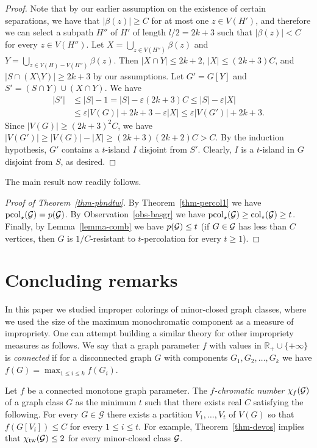 \documentclass[12pt]{article}
\newcommand{\GG}{{\cal G}}
\newcommand{\eps}{\varepsilon}
\newcommand{\mc}[1]{\mathcal{#1}}
\newcommand{\brm}[1]{\operatorname{#1}}
\newcommand{\bb}[1]{\mathbb{#1}}
\begin{document}
\begin{proof}
Note that by our earlier assumption on the existence of certain separations,  we have that $|\beta(z)| \geq C$ for at most one $z \in V(H')$, and therefore we can select
a subpath  $H''$ of $H'$  of length $l/2=2k+3$ 
such that  $|\beta(z)| < C$ for every $z \in V(H'')$. Let $X=\bigcup_{z \in V(H'')}\beta(z)$ and
$Y= \bigcup_{z \in V(H)-V(H'')}\beta(z)$. Then $|X \cap Y| \leq 2k+2$, $|X| \leq (2k+3)C$, and $|S \cap (X \setminus Y)| \geq 2k+3$ by our assumptions.
Let $G'=G[Y]$ and $S'= (S \cap Y) \cup (X \cap Y)$. We have
\begin{align*}
|S'| &\leq |S|-1 =|S|-\eps(2k+3)C \le |S|-\eps|X|\\
&\leq \eps|V(G)|+2k+3-\eps|X| \leq \eps|V(G')|+2k+3.
\end{align*}
Since $|V(G)|\ge (2k+3)^2C$, we have $|V(G')|\ge |V(G)|-|X|\ge (2k+3)(2k+2)C>C$.
By the induction hypothesis, $G'$ contains a $t$-island $I$ disjoint from $S'$. Clearly, $I$ is a $t$-island in $G$ disjoint from $S$, as desired.
\end{proof}

The main result now readily follows.

\begin{proof}[Proof of Theorem~\ref{thm-pbndtw}]
By Theorem~\ref{thm-percol1} we have $\text{pcol}_\star(\GG)=p(\GG)$.  
By Observation~\ref{obs-basgr} we have $\text{pcol}_\star(\GG) \geq \text{col}_\star(\GG) \geq t$.
Finally, by Lemma~\ref{lemma-comb} we have $p(\GG) \leq t$ (if $G\in \GG$ has less than $C$ vertices,
then $G$ is $1/C$-resistant to $t$-percolation for every $t\ge 1$).
\end{proof}

\section{Concluding remarks}

In this paper we studied improper colorings of minor-closed graph classes, where we used the size of the maximum monochromatic component as a measure of impropriety. One can attempt building a similar theory for other impropriety measures as follows.  We say that a graph parameter $f$ with values in $\bb{R}_+ \cup \{+\infty\}$ is \emph{connected} if for a disconnected graph $G$ with components $G_1,G_2,\ldots,G_k$ we have $f(G)=\max_{1 \leq i \leq k}f(G_i)$. 

Let $f$ be a connected monotone graph parameter. 
  The \emph{$f$-chromatic number} $\chi_{f}(\GG)$  of a graph class $G$ as the minimum $t$ such that there exists real $C$ satisfying the following. For every $G  \in \mc{G}$ there exists a partition $V_1,\ldots,V_t$ of $V(G)$ so that $f(G[V_i]) \leq C$ for every $1 \leq i \leq t$. For example, Theorem~\ref{thm-devos} implies that $\chi_{\brm{tw}}(\GG) \leq 2$ for every minor-closed class $\GG$. 
\end{document}
